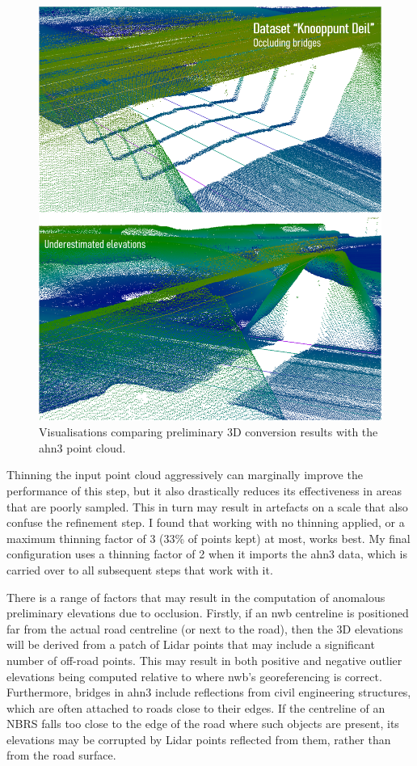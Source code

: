 \begin{figure}
    \centering
    \includegraphics[width=\linewidth]{final_report/figs/elevationestimation2.png}
    \caption{Visualisations comparing preliminary 3D conversion results with the \ac{ahn3} point cloud.}
    \label{fig:elevationestimation2}
\end{figure}

Thinning the input point cloud aggressively can marginally improve the performance of this step, but it also drastically reduces its effectiveness in areas that are poorly sampled. This in turn may result in artefacts on a scale that also confuse the refinement step. I found that working with no thinning applied, or a maximum thinning factor of 3 (33\% of points kept) at most, works best. My final configuration uses a thinning factor of 2 when it imports the \ac{ahn3} data, which is carried over to all subsequent steps that work with it.

There is a range of factors that may result in the computation of anomalous preliminary elevations due to occlusion. Firstly, if an \ac{nwb} centreline is positioned far from the actual road centreline (or next to the road), then the 3D elevations will be derived from a patch of Lidar points that may include a significant number of off-road points. This may result in both positive and negative outlier elevations being computed relative to where \ac{nwb}'s georeferencing is correct. Furthermore, bridges in \ac{ahn3} include reflections from civil engineering structures, which are often attached to roads close to their edges. If the centreline of an NBRS falls too close to the edge of the road where such objects are present, its elevations may be corrupted by Lidar points reflected from them, rather than from the road surface.

